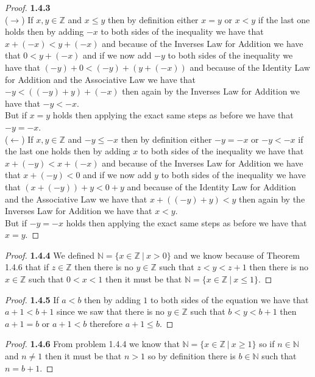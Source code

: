 \documentclass[11pt]{article}
\newcommand{\N}{\mathbb{N}}
\newcommand{\Z}{\mathbb{Z}}
\theoremstyle{definition}
\begin{document}
    \begin{proof}{\textbf{1.4.3}}\\
        ($\rightarrow$) If $x,y\in\Z$ and $x \leq y$ then by definition either $x=y$ or
        $x<y$ if the last one holds then by adding $-x$ to both sides of the inequality
        we have that $x+(-x)<y+(-x)$ and because of the Inverses Law for Addition we
        have that $0 < y+(-x)$ and if we now add $-y$ to both sides of the inequality
        we have that $(-y)+0<(-y)+(y+(-x))$ and because of the Identity Law for Addition
        and the Associative Law we have that $-y < ((-y)+y)+(-x)$ then again by the
        Inverses Law for Addition we have that $-y < -x$.\\
        But if $x=y$ holds then applying the exact same steps as before we have that
        $-y=-x$.\\
        ($\leftarrow$) If $x,y\in\Z$ and $-y \leq -x$ then by definition either $-y=-x$ or
        $-y<-x$ if the last one holds then by adding $x$ to both sides of the inequality
        we have that $x+(-y)<x+(-x)$ and because of the Inverses Law for Addition we
        have that $x+(-y)< 0$ and if we now add $y$ to both sides of the inequality
        we have that $(x+(-y))+y<0+y$ and because of the Identity Law for Addition
        and the Associative Law we have that $x + ((-y)+y) < y$ then again by the
        Inverses Law for Addition we have that $x < y$.\\
        But if $-y=-x$ holds then applying the exact same steps as before we have that
        $x=y$.
    \end{proof}
\cleardoublepage
    \begin{proof}{\textbf{1.4.4}}
        We defined $\N = \{x \in \Z~|~x>0\}$ and we know because of Theorem 1.4.6 that
        if $z \in \Z$ then there is no $y\in\Z$ such that $z<y<z+1$ then there is no
        $x \in \Z$ such that $0<x<1$ then it must be that $\N = \{x \in \Z~|~x\leq 1\}$.
    \end{proof}
    \begin{proof}{\textbf{1.4.5}}
        If $a<b$ then by adding $1$ to both sides of the equation we have that $a+1<b+1$
        since we saw that there is no $y\in\Z$ such that $b<y<b+1$ then $a+1=b$ or
        $a+1<b$ therefore $a+1\leq b$.
    \end{proof}
    \begin{proof}{\textbf{1.4.6}}
        From problem 1.4.4 we know that $\N = \{x\in\Z~|~x\geq 1\}$ so if $n\in\N$ and
        $n\neq 1$ then it must be that $n > 1$ so by definition there is $b \in \N$ such
        that $n = b + 1$.
    \end{proof}
\end{document}
